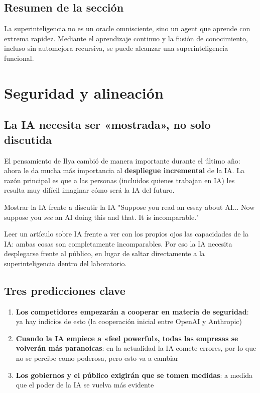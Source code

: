 \documentclass[a4paper]{article}
\begin{document}
\subsection{Resumen de la sección}

La superinteligencia no es un oracle omnisciente, sino un agent que aprende con extrema rapidez. Mediante el aprendizaje continuo y la fusión de conocimiento, incluso sin automejora recursiva, se puede alcanzar una superinteligencia funcional.


\section{Seguridad y alineación}

\subsection{La IA necesita ser «mostrada», no solo discutida}

El pensamiento de Ilya cambió de manera importante durante el último año: ahora le da mucha más importancia al \textbf{despliegue incremental} de la IA. La razón principal es que a las personas (incluidos quienes trabajan en IA) les resulta muy difícil imaginar cómo será la IA del futuro.

\begin{importantbox}{Mostrar la IA frente a discutir la IA}
"Suppose you read an essay about AI... Now suppose you \textit{see} an AI doing this and that. It is incomparable."

Leer un artículo sobre IA frente a ver con los propios ojos las capacidades de la IA: ambas cosas son completamente incomparables. Por eso la IA necesita desplegarse frente al público, en lugar de saltar directamente a la superinteligencia dentro del laboratorio.
\end{importantbox}

\subsection{Tres predicciones clave}

\begin{enumerate}
    \item \textbf{Los competidores empezarán a cooperar en materia de seguridad}: ya hay indicios de esto (la cooperación inicial entre OpenAI y Anthropic)
    \item \textbf{Cuando la IA empiece a «feel powerful», todas las empresas se volverán más paranoicas}: en la actualidad la IA comete errores, por lo que no se percibe como poderosa, pero esto va a cambiar
    \item \textbf{Los gobiernos y el público exigirán que se tomen medidas}: a medida que el poder de la IA se vuelva más evidente
\end{enumerate}
\end{document}

